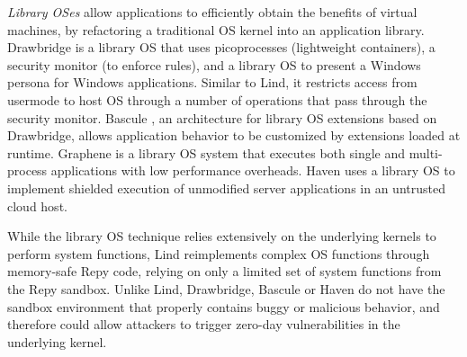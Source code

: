 \textit{Library OSes}
allow applications to efficiently
obtain the benefits of virtual machines,  
by refactoring a traditional OS kernel into an application library. 
%
Drawbridge \cite{Drawbridge-11} is a library OS that uses picoprocesses
(lightweight containers), a security monitor (to enforce rules),
and a library OS to present a Windows persona for %
Windows applications. Similar to Lind,
it restricts access from usermode to host OS through a number
of operations that pass through the security monitor.
%
%
Bascule \cite{Bascule}, an architecture for library OS extensions
based on Drawbridge, allows application behavior to be customized by
extensions loaded at runtime.
Graphene \cite{Graphene-14} is a library OS system that
executes both single and
multi-process applications with low performance overheads.
Haven \cite{Haven} uses a library OS to implement
shielded execution of unmodified server applications
in an untrusted cloud host.

While the library OS technique relies extensively on
the underlying kernels to perform system functions,
Lind reimplements complex OS functions through memory-safe Repy
code, relying on only a limited set of system functions from the Repy
sandbox. Unlike Lind, Drawbridge, Bascule or Haven
do not have the sandbox environment that properly contains
buggy or malicious behavior, and therefore could allow attackers
to trigger zero-day vulnerabilities in the underlying kernel.

